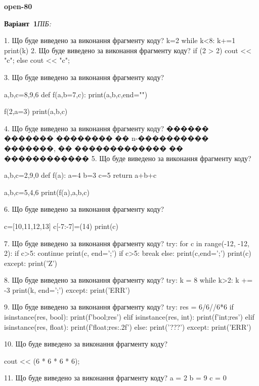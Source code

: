 \documentclass[11pt]{article}
\begin{document}
{\large\textbf{open-80}}

\textbf{Варіант \No\,1}\hfill \textit{ПІБ:}\,\underline{\hspace{60mm}}
\vspace{4mm}

1. Що буде виведено за виконання фрагменту коду?
k=2
   while k<8: k+=1
   print(k)
2. Що буде виведено за виконання фрагменту коду?
if (2 > 2)
    cout << "c";
else
    cout << "c";


3. Що буде виведено за виконання фрагменту коду?

a,b,c=8,9,6
def f(a,b=7,c):
    print(a,b,c,end="")

f(2,a=3)
print(a,b,c)


4. Що буде виведено за виконання фрагменту коду?
������ ������� �������� �� n-���������� �������, �� ������������� �� ������������
5. Що буде виведено за виконання фрагменту коду?

a,b,c=2,9,0
def f(a):
    a=4
    b=3
    c=5
    return a+b+c

a,b,c=5,4,6
print(f(a),a,b,c)

6. Що буде виведено за виконання фрагменту коду?

c=[10,11,12,13]
c[-7:-7]=(14)
print(c)


7. Що буде виведено за виконання фрагменту коду?
try:
    for c in range(-12, -12, 2):
        if c>5:
            continue
        print(c, end=';')
        if c>5:
            break
    else:
        print(c,end=';')
    print(c)
except:
    print('Z')

8. Що буде виведено за виконання фрагменту коду?
try:
    k = 8
    while k>2:
        k += -3
    print(k, end=';')
except:
    print('ERR')

9. Що буде виведено за виконання фрагменту коду?
try:
    res = 6/6//6*6
    if isinstance(res, bool):
        print(f'bool;{res}')
    elif isinstance(res, int):
        print(f'int;{res}')
    elif isinstance(res, float):
        print(f'float;{res:.2f}')
    else:
        print('???')
except:
    print('ERR')

10. Що буде виведено за виконання фрагменту коду?

cout << (6 * 6 * 6 * 6);

11. Що буде виведено за виконання фрагменту коду?
a = 2
b = 9
c = 0
\end{document}
